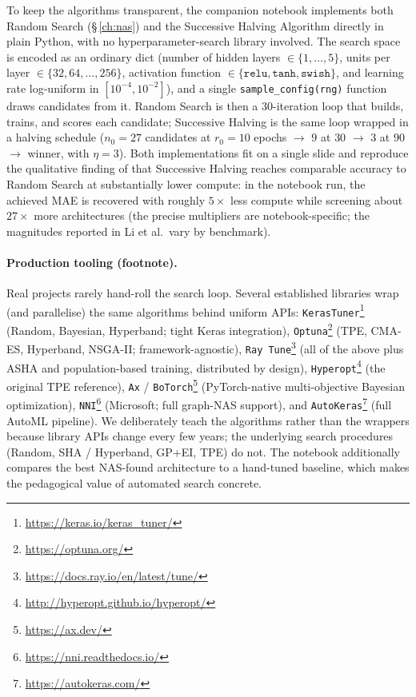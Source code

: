 \documentclass[11pt,a4paper]{report}
\begin{document}
To keep the algorithms transparent, the companion notebook  implements both Random Search (\S\,\ref{ch:nas}) and the Successive Halving Algorithm directly in plain Python, with no hyperparameter-search library involved.  The search space is encoded as an ordinary dict (number of hidden layers $\in \{1,\ldots,5\}$, units per layer $\in \{32, 64, \ldots, 256\}$, activation function $\in \{\texttt{relu}, \texttt{tanh}, \texttt{swish}\}$, and learning rate log-uniform in $[10^{-4}, 10^{-2}]$), and a single \texttt{sample\_config(rng)} function draws candidates from it.  Random Search is then a $30$-iteration loop that builds, trains, and scores each candidate; Successive Halving is the same loop wrapped in a halving schedule ($n_0 = 27$ candidates at $r_0 = 10$ epochs $\to$ $9$ at $30$ $\to$ $3$ at $90$ $\to$ winner, with $\eta = 3$).  Both implementations fit on a single slide and reproduce the qualitative finding of \citet{li2018hyperband} that Successive Halving reaches comparable accuracy to Random Search at substantially lower compute: in the notebook run, the achieved MAE is recovered with roughly $5\times$ less compute while screening about $27\times$ more architectures (the precise multipliers are notebook-specific; the magnitudes reported in Li et al.\ vary by benchmark).

\paragraph{Production tooling (footnote).}  Real projects rarely hand-roll the search loop.  Several established libraries wrap (and parallelise) the same algorithms behind uniform APIs: \texttt{KerasTuner}\footnote{\url{https://keras.io/keras_tuner/}} (Random, Bayesian, Hyperband; tight Keras integration), \texttt{Optuna}\footnote{\url{https://optuna.org/}} (TPE, CMA-ES, Hyperband, NSGA-II; framework-agnostic), \texttt{Ray Tune}\footnote{\url{https://docs.ray.io/en/latest/tune/}} (all of the above plus ASHA and population-based training, distributed by design), \texttt{Hyperopt}\footnote{\url{http://hyperopt.github.io/hyperopt/}} (the original TPE reference), \texttt{Ax} / \texttt{BoTorch}\footnote{\url{https://ax.dev/}} (PyTorch-native multi-objective Bayesian optimization), \texttt{NNI}\footnote{\url{https://nni.readthedocs.io/}} (Microsoft; full graph-NAS support), and \texttt{AutoKeras}\footnote{\url{https://autokeras.com/}} (full AutoML pipeline).  We deliberately teach the algorithms rather than the wrappers because library APIs change every few years; the underlying search procedures (Random, SHA / Hyperband, GP+EI, TPE) do not.  The notebook additionally compares the best NAS-found architecture to a hand-tuned baseline, which makes the pedagogical value of automated search concrete.
\end{document}
